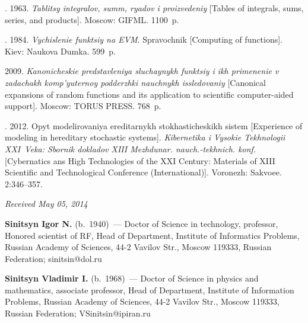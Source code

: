 \begin{multicols}{2}
{{\begin{thebibliography}{99}
.  1963.
\textit{Tablitsy integralov, summ, ryadov i proizvedeniy}
[Tables of integrals, sums, series, and products]. Moscow:  GIFML.   1100~p.

\pagebreak

.  1984.
\textit{Vychislenie funktsiy na EVM}. Spravochnik [Computing of functions].
Kiev: Naukova Dumka.  599~p.


 2009.
\textit{Kanonicheskie predstavleniya sluchaynykh funktsiy i ikh primenenie v
zadachakh komp'yuternoy podderzhki nauchnykh issledovaniy}
[Canonical expansions of random functions and its application to
scientific computer-aided support]. Moscow: TORUS PRESS. 768~p.

.
2012. Opyt modelirovaniya ereditarnykh stokhasticheskikh sistem
[Experience of modeling in hereditary stochastic systems].
\textit{Kibernetika i Vysokie Tekhnologii XXI~Veka:
Sbornik dokladov  XIII Mezhdunar. nauch.-tekhnich. konf.}
[Cybernatics ans High Technologies of the XXI Century: Materials of
XIII  Scientific and Technological Conference (International)].
Voronezh: Sakvoee. 2:346--357.

\end{thebibliography}

 }
 }

\end{multicols}

\vspace*{-6pt}

\hfill{\small\textit{Received May 05, 2014}}

\vspace*{-18pt}

\Contr

\noindent
\textbf{Sinitsyn Igor N.} (b.\ 1940)~---
Doctor of Science in technology, professor, Honored scientist of RF, Head of Department, Institute of
Informatics Problems, Russian Academy of Sciences,
44-2 Vavilov Str., Moscow 119333, Russian
Federation; sinitsin@dol.ru

\vspace*{3pt}

\noindent
\textbf{Sinitsyn Vladimir I.} (b.\ 1968)~--- Doctor of Science in physics
and mathematics, associate professor, Head of Department, Institute of
Information Problems, Russian Academy of Sciences,
44-2 Vavilov Str., Moscow 119333, Russian Federation; VSinitsin@ipiran.ru




\label{end\stat}

\renewcommand{\bibname}{\protect\rm Литература}